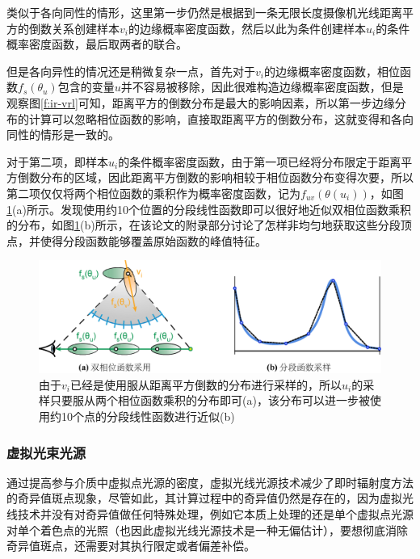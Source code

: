 类似于各向同性的情形，这里第一步仍然是根据到一条无限长度摄像机光线距离平方的倒数关系创建样本$v_i$的边缘概率密度函数，然后以此为条件创建样本$u_i$的条件概率密度函数，最后取两者的联合。

但是各向异性的情况还是稍微复杂一点，首先对于$v_i$的边缘概率密度函数，相位函数$f_s(\theta_u)$包含的变量$u$并不容易被移除，因此很难构造边缘概率密度函数，但是观察图\ref{f:ir-vrl}可知，距离平方的倒数分布是最大的影响因素，所以第一步边缘分布的计算可以忽略相位函数的影响，直接取距离平方的倒数分布，这就变得和各向同性的情形是一致的。

对于第二项，即样本$u_i$的条件概率密度函数，由于第一项已经将分布限定于距离平方倒数分布的区域，因此距离平方倒数的影响相较于相位函数分布变得次要，所以第二项仅仅将两个相位函数的乘积作为概率密度函数，记为$f_{uv}(\theta(u_i))$，如图\ref{f:ir-vrl-piece-wise-sampling}(a)所示。\cite{a:VirtualRayLightsforRenderingSceneswithParticipatingMedia}发现使用约10个位置的分段线性函数即可以很好地近似双相位函数乘积的分布，如图\ref{f:ir-vrl-piece-wise-sampling}(b)所示，在该论文的附录部分讨论了怎样非均匀地获取这些分段顶点，并使得分段函数能够覆盖原始函数的峰值特征。

\begin{figure}
	\includegraphics[width=1.\textwidth]{figures/ir/vrl-piece-wise-sampling}
	\caption{由于$v_i$已经是使用服从距离平方倒数的分布进行采样的，所以$u_i$的采样只要服从两个相位函数乘积的分布即可(a)，该分布可以进一步被使用约10个点的分段线性函数进行近似(b)}
	\label{f:ir-vrl-piece-wise-sampling}
\end{figure}



\subsubsection{虚拟光束光源}\label{sec:ir-vbl}
通过提高参与介质中虚拟点光源的密度，虚拟光线光源技术减少了即时辐射度方法的奇异值斑点现象，尽管如此，其计算过程中的奇异值仍然是存在的，因为虚拟光线技术并没有对奇异值做任何特殊处理，例如它本质上处理的还是单个虚拟点光源对单个着色点的光照（也因此虚拟光线光源技术是一种无偏估计），要想彻底消除奇异值斑点，还需要对其执行限定或者偏差补偿。

